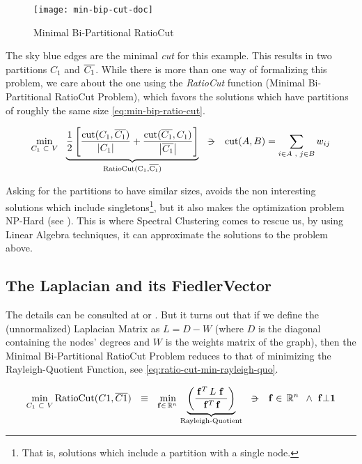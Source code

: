 \begin{figure}[H]
  \centering
  \caption{Minimal Bi-Partitional RatioCut}
  \label{fig:min-bip-cut}  
  \texttt{[image: min-bip-cut-doc]}
\end{figure}

The sky blue edges are the minimal \emph{cut} for this example. This results
in two partitions $C_1$ and $\overline{C_1}$. While there is more than
one way of formalizing this problem, we care about the one
using the \emph{RatioCut} function (Minimal Bi-Partitional RatioCut Problem),
which favors the solutions which have partitions of roughly
the same size \cref{eq:min-bip-ratio-cut}.

\begin{equation}
  \label{eq:min-bip-ratio-cut}
  \min\limits_{\tiny{C_1 \ds{\subset} V}} \ds{}
  \underbrace{      
    \frac{1}{2}
    \left[
      \dfrac{\func{cut}(C_1,\stcomp{C_1})}{\abs{C_1}} +
      \dfrac{\func{cut}(\stcomp{C_1},C_1)}{\abs{\stcomp{C_1}}}
      \right]
  }_{\func{RatioCut(C_1,\stcomp{C_1})}}
  \ds{\suchthat}
  \func{cut}(A,B) = \sum\limits_{\tiny{i \in A \ds{,} j \in B}} w_{ij}
\end{equation}
\joinbelow{1cm}

Asking for the partitions to have similar sizes, avoids the non
interesting solutions which include singletons\footnote{That is,
  solutions which include a partition with a single node.}, but it also  
makes the optimization problem NP-Hard (see
\cite{wagner93}). This 
is where Spectral Clustering comes to rescue us, by using Linear
Algebra techniques, it can approximate the solutions to the problem
above.

\subsection{The \gls{Laplacian} and its \gls{FiedlerVector}}\label{sub:lap-fvec}
The details can be consulted at \cite{luxburg07} or
\cite{gao13}. But it turns out that if we define the (unnormalized)
\gls{Laplacian} Matrix as $L = D - W$ (where $D$ is the diagonal containing
the nodes' degrees and $W$ is the weights matrix of the graph), then
the Minimal Bi-Partitional RatioCut Problem reduces to that of minimizing the
Rayleigh-Quotient Function, see \cref{eq:ratio-cut-min-rayleigh-quo}.

\begin{equation}
  \label{eq:ratio-cut-min-rayleigh-quo}
  \min\limits_{C_1 \ds{\subset} V} \func{RatioCut}(C1,\stcomp{C1})
  \ds{\ds{\equiv}}
  \min\limits_{\vec{f} \in \R{n}}
  \underbrace{
    \left(\dfrac{\trans{\vec{f}} L \ds{\vec{f}}}{\trans{\vec{f}} \vec{f}}\right)
  }_{\text{Rayleigh-Quotient}}    
  \ds{\suchthat}
  \vec{f} \in \R{n} \ds{\land} \vec{f} \bot \vec{1}
\end{equation}
\joinbelow{1cm}

